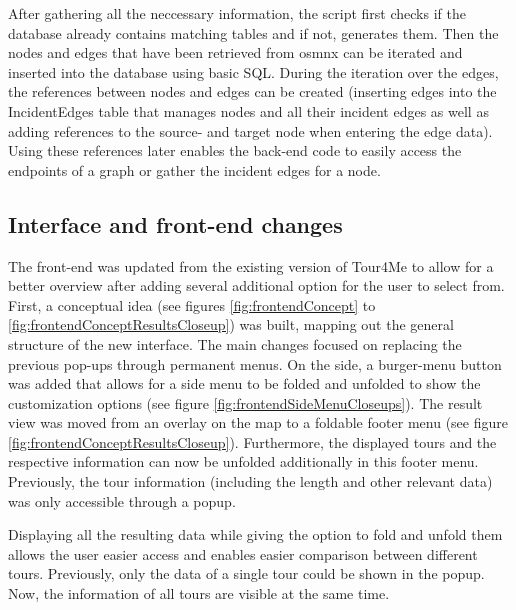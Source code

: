 After gathering all the neccessary information, the script first checks if the database already contains matching tables and if not, generates them.
Then the nodes and edges that have been retrieved from osmnx can be iterated and inserted into the database using basic SQL.
During the iteration over the edges, the references between nodes and edges can be created (inserting edges into the IncidentEdges table that manages nodes and all their incident edges as well as adding references to the source- and target node when entering the edge data).
Using these references later enables the back-end code to easily access the endpoints of a graph or gather the incident edges for a node. 



\subsection{Interface and front-end changes}
\label{subsec:interfaceAndFrontendChanges}

The front-end was updated from the existing version of Tour4Me to allow for a better overview after adding several additional option for the user to select from. 
First, a conceptual idea (see figures \ref{fig:frontendConcept} to \ref{fig:frontendConceptResultsCloseup}) was built, mapping out the general structure of the new interface. 
The main changes focused on replacing the previous pop-ups through permanent menus.
On the side, a burger-menu button was added that allows for a side menu to be folded and unfolded to show the customization options (see figure \ref{fig:frontendSideMenuCloseups}). 
The result view was moved from an overlay on the map to a foldable footer menu (see figure \ref{fig:frontendConceptResultsCloseup}). 
Furthermore, the displayed tours and the respective information can now be unfolded additionally in this footer menu.
Previously, the tour information (including the length and other relevant data) was only accessible through a popup. 

Displaying all the resulting data while giving the option to fold and unfold them allows the user easier access and enables easier comparison between different tours.
Previously, only the data of a single tour could be shown in the popup. 
Now, the information of all tours are visible at the same time. 



